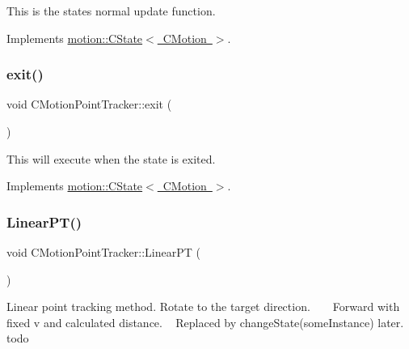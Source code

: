 This is the states normal update function. 

Implements \mbox{\hyperlink{classmotion_1_1CState_a71dc72d345b15bf3b5b5bff596a71f33}{motion\+::\+C\+State$<$ C\+Motion $>$}}.

\mbox{\label{classmotion_1_1CMotionPointTracker_ae40c6dc8e2883a6293b2ea5994b0e3d1}} 
\subsubsection{\texorpdfstring{exit()}{exit()}}
{\footnotesize\ttfamily void C\+Motion\+Point\+Tracker\+::exit (\begin{DoxyParamCaption}\item[{\mbox{\hyperlink{classmotion_1_1CMotion}{C\+Motion}} $\ast$}]{ }\end{DoxyParamCaption})\hspace{0.3cm}{\ttfamily [virtual]}}

This will execute when the state is exited. 

Implements \mbox{\hyperlink{classmotion_1_1CState_a353db064c159d66b82bf257b35e7c016}{motion\+::\+C\+State$<$ C\+Motion $>$}}.

\mbox{\label{classmotion_1_1CMotionPointTracker_a79e987afad15936fb09e7e2705aff01e}} 
\subsubsection{\texorpdfstring{Linear\+P\+T()}{LinearPT()}}
{\footnotesize\ttfamily void C\+Motion\+Point\+Tracker\+::\+Linear\+PT (\begin{DoxyParamCaption}\item[{void}]{ }\end{DoxyParamCaption})}

Linear point tracking method. Rotate to the target direction. ~\newline
~\newline
 Forward with fixed v and calculated distance. ~\newline
 Replaced by change\+State(some\+Instance) later. todo \mbox{\label{classmotion_1_1CMotionPointTracker_abde667e158fa615c6e761ac3167c9359}} 
